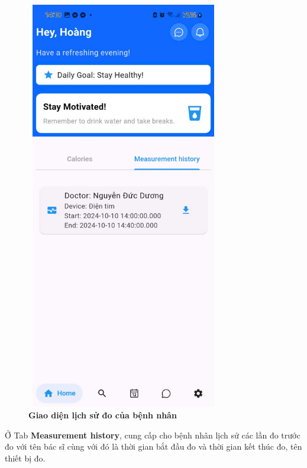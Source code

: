 \begin{figure}[H]
	\centering
	\includegraphics[width=8.5cm,height=18cm]{Images/AppUI/homePagePatient2.jpg}
	\caption[Giao diện lịch sử đo của bệnh nhân]{\bfseries \fontsize{12pt}{0pt}\selectfont Giao diện lịch sử đo của bệnh nhân}
	\label{measurementHistory}
\end{figure}
	Ở Tab \textbf{Measurement history}, cung cấp cho bệnh nhân lịch sử các lần đo trước đo với tên bác sĩ cùng với đó là thời gian bắt đầu đo và thời gian kết thúc đo, tên thiết bị đo.

